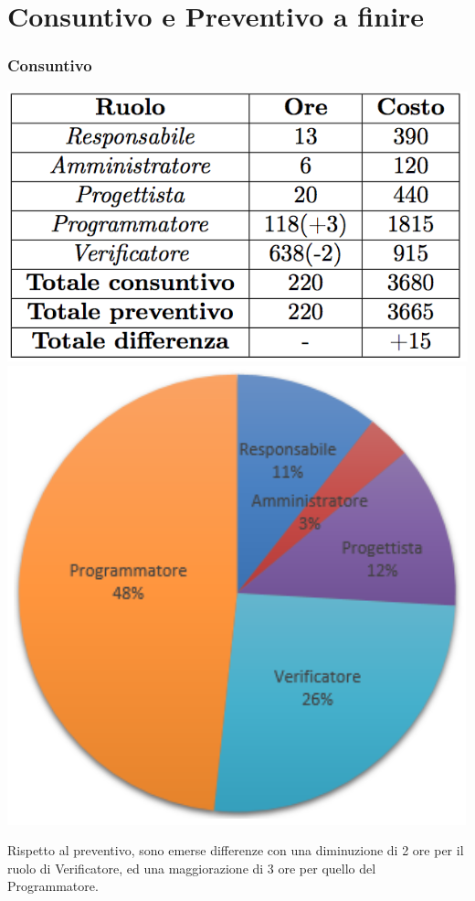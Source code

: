 \section{Consuntivo e Preventivo a finire}
\begin{frame}
  \frametitle{Consuntivo}
  \begin{center}
  	\includegraphics[scale=0.5]{img/prevCD}
  	\includegraphics[scale=0.4]{img/cakeCD}
  \end{center}
Rispetto al preventivo, sono emerse differenze con una diminuzione di 2 ore per il ruolo di Verificatore, ed una maggiorazione di 3 ore per quello del Programmatore.
\end{frame}

